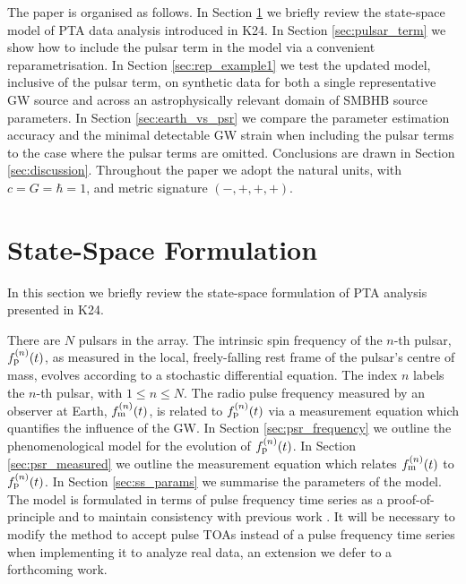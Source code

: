 \documentclass[fleqn,usenatbib,useAMS]{mnras}
\begin{document}
The paper is organised as follows. In Section \ref{sec:2} we briefly review the state-space model of PTA data analysis introduced in K24. In Section \ref{sec:pulsar_term} we show how to include the pulsar term in the model via a convenient reparametrisation. In Section \ref{sec:rep_example1} we test the updated model, inclusive of the pulsar term, on synthetic data for both a single representative GW source and across an astrophysically relevant domain of SMBHB source parameters. In Section \ref{sec:earth_vs_psr} we compare the parameter estimation accuracy and the minimal detectable GW strain when including the pulsar terms to the case where the pulsar terms are omitted. Conclusions are drawn in Section \ref{sec:discussion}. Throughout the paper we adopt the natural units, with $c = G = \hbar = 1$, and metric signature $(-,+,+,+)$. \newline 







\section{State-Space Formulation}\label{sec:2}
In this section we briefly review the state-space formulation of PTA analysis presented in K24. \newline 

There are $N$ pulsars in the array. The intrinsic spin frequency of the $n$-th pulsar, $f_{\rm p}^{(n)}(t)$, as measured in the local, freely-falling rest frame of the pulsar's centre of mass, evolves according to a stochastic differential equation. The index $n$ labels the $n$-th pulsar, with $1\leq n\leq N$. The radio pulse frequency measured by an observer at Earth, $f_{\rm m}^{(n)}(t)$, is related to $f_{\rm p}^{(n)}(t)$ via a measurement equation which quantifies the influence of the GW. In Section \ref{sec:psr_frequency} we outline the phenomenological model for the evolution of $f_{\rm p}^{(n)}(t)$. In Section \ref{sec:psr_measured} we outline the measurement equation which relates $f_{\rm m}^{(n)}(t)$ to $f_{\rm p}^{(n)}(t)$. In Section \ref{sec:ss_params} we summarise the parameters of the model. The model is formulated in terms of pulse frequency time series as a proof-of-principle and to maintain consistency with previous work \citep{Myers2021MNRAS.502.3113M,Meyers2021,KimpsonPTA}. It will be necessary to modify the method to accept pulse TOAs instead of a pulse frequency time series when implementing it to analyze real data, an extension we defer to a forthcoming work. 
\end{document}
